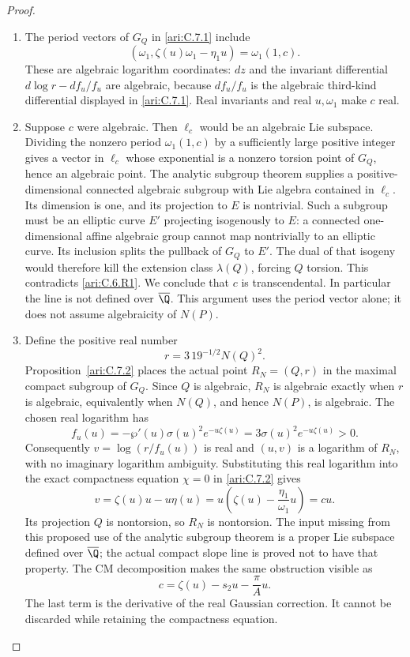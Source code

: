 \begin{proof}
\begin{enumerate}[label=\arabic*.,leftmargin=*]
\item The period vectors of $G_Q$ in \ref{ari:C.7.1} include
\[
 (\omega_1,\zeta(u)\omega_1-\eta_1u)
       =\omega_1(1,c).
\]
These are algebraic logarithm coordinates: $dz$ and the
invariant differential $d\log r-df_u/f_u$ are algebraic,
because $df_u/f_u$ is the algebraic third-kind differential
displayed in \ref{ari:C.7.1}. Real invariants and real $u,\omega_1$
make $c$ real.

\item Suppose $c$ were algebraic. Then $\ell_c$ would be an
algebraic Lie subspace. Dividing the nonzero period
$\omega_1(1,c)$ by a sufficiently large positive integer
gives a vector in $\ell_c$ whose exponential is a nonzero
torsion point of $G_Q$, hence an algebraic point. The
analytic subgroup theorem
\citep[Theorem 6.1]{huber2022} supplies a positive-dimensional
connected algebraic subgroup with Lie algebra contained in
$\ell_c$. Its dimension is one, and its projection to $E$
is nontrivial. Such a subgroup must be an elliptic curve
$E'$ projecting isogenously to $E$: a connected
one-dimensional affine algebraic group cannot map
nontrivially to an elliptic curve. Its inclusion splits the
pullback of $G_Q$ to $E'$. The dual of that isogeny would
therefore kill the extension class $\lambda(Q)$, forcing
$Q$ torsion. This contradicts \ref{ari:C.6.R1}. We conclude that $c$
is transcendental. In particular the line is not defined over
$\overline\Q$. This argument uses the period vector alone;
it does not assume algebraicity of $N(P)$.

\item Define the positive real number
\[
 r=3\,19^{-1/2}N(Q)^2.
\]
Proposition~\ref{ari:C.7.2} places the actual point $R_N=(Q,r)$
in the maximal compact subgroup of $G_Q$. Since $Q$ is algebraic,
$R_N$ is algebraic exactly when $r$ is algebraic, equivalently
when $N(Q)$, and hence $N(P)$, is algebraic. The chosen real
logarithm has
\[
 f_u(u)=-\wp'(u)\sigma(u)^2e^{-u\zeta(u)}
        =3\sigma(u)^2e^{-u\zeta(u)}>0.
\]
Consequently $v=\log(r/f_u(u))$ is real and
$(u,v)$ is a logarithm of $R_N$, with no imaginary logarithm
ambiguity. Substituting this real logarithm into the exact
compactness equation $\chi=0$ in \ref{ari:C.7.2} gives
\[
 v=\zeta(u)u-u\eta(u)
   =u\left(\zeta(u)-\frac{\eta_1}{\omega_1}u\right)=cu.
\]
Its projection $Q$ is nontorsion, so $R_N$ is nontorsion.
The input missing from this proposed use of the analytic
subgroup theorem is a proper Lie subspace defined over
$\overline\Q$; the actual compact slope line is proved
not to have that property. The CM decomposition makes the
same obstruction visible as
\[
 c=\zeta(u)-s_2u-\frac{\pi}{A}u.
\]
The last term is the derivative of the real Gaussian
correction. It cannot be discarded while retaining the
compactness equation.
\end{enumerate}
\end{proof}

